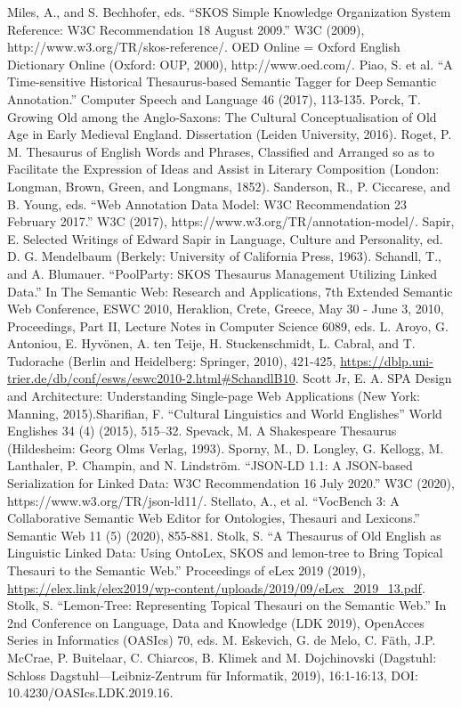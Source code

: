 Miles, A., and S. Bechhofer, eds. “SKOS Simple Knowledge Organization System Reference: W3C Recommendation 18 August 2009.” W3C (2009), http://www.w3.org/TR/skos-reference/.
OED Online = Oxford English Dictionary Online (Oxford: OUP, 2000), http://www.oed.com/.
Piao, S. et al. “A Time-sensitive Historical Thesaurus-based Semantic Tagger for Deep Semantic Annotation.” Computer Speech and Language 46 (2017), 113-135.
Porck, T. Growing Old among the Anglo-Saxons: The Cultural Conceptualisation of Old Age in Early Medieval England. Dissertation (Leiden University, 2016). 
Roget, P. M. Thesaurus of English Words and Phrases, Classified and Arranged so as to Facilitate the Expression of Ideas and Assist in Literary Composition (London: Longman, Brown, Green, and Longmans, 1852).
Sanderson, R., P. Ciccarese, and B. Young, eds. “Web Annotation Data Model: W3C Recommendation 23 February 2017.” W3C (2017), https://www.w3.org/TR/annotation-model/.
Sapir, E. Selected Writings of Edward Sapir in Language, Culture and Personality, ed. D. G. Mendelbaum (Berkely: University of California Press, 1963).
Schandl, T., and A. Blumauer. “PoolParty: SKOS Thesaurus Management Utilizing Linked Data.” In The Semantic Web: Research and Applications, 7th Extended Semantic Web Conference, ESWC 2010, Heraklion, Crete, Greece, May 30 - June 3, 2010, Proceedings, Part II, Lecture Notes in Computer Science 6089, eds. L. Aroyo, G. Antoniou, E. Hyvönen, A. ten Teije, H. Stuckenschmidt, L. Cabral, and T. Tudorache (Berlin and Heidelberg: Springer, 2010), 421-425, \url{https://dblp.uni-trier.de/db/conf/esws/eswc2010-2.html#SchandlB10}.
Scott Jr, E. A. SPA Design and Architecture: Understanding Single-page Web Applications (New York: Manning, 2015).Sharifian, F. “Cultural Linguistics and World Englishes” World Englishes 34 (4) (2015), 515–32. 
Spevack, M. A Shakespeare Thesaurus (Hildesheim: Georg Olms Verlag, 1993).
Sporny, M., D. Longley, G. Kellogg, M. Lanthaler, P. Champin, and N. Lindström. “JSON-LD 1.1: A JSON-based Serialization for Linked Data: W3C Recommendation 16 July 2020.” W3C (2020), https://www.w3.org/TR/json-ld11/.
Stellato, A., et al. “VocBench 3: A Collaborative Semantic Web Editor for Ontologies, Thesauri and Lexicons.” Semantic Web 11 (5) (2020), 855-881.
Stolk, S. “A Thesaurus of Old English as Linguistic Linked Data: Using OntoLex, SKOS and lemon-tree to Bring Topical Thesauri to the Semantic Web.” Proceedings of eLex 2019 (2019), \url{https://elex.link/elex2019/wp-content/uploads/2019/09/eLex_2019_13.pdf}.
Stolk, S. “Lemon-Tree: Representing Topical Thesauri on the Semantic Web.” In 2nd Conference on Language, Data and Knowledge (LDK 2019), OpenAcces Series in Informatics (OASIcs) 70, eds. M. Eskevich, G. de Melo, C. Fäth, J.P. McCrae, P. Buitelaar, C. Chiarcos, B. Klimek and M. Dojchinovski (Dagstuhl: Schloss Dagstuhl—Leibniz-Zentrum für Informatik, 2019), 16:1-16:13, DOI: 10.4230/OASIcs.LDK.2019.16.
